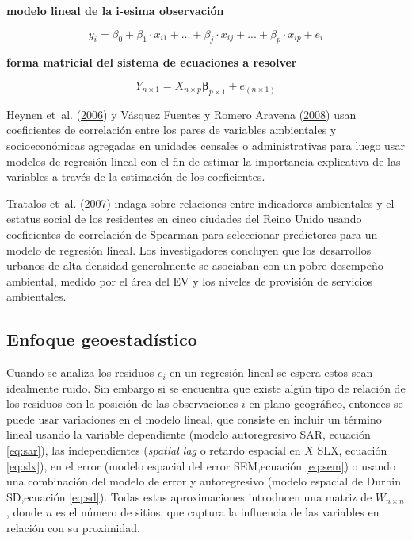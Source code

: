 \documentclass[12pt,a4paper,openany]{book}
\theoremstyle{definition}
\theoremstyle{definition}
\theoremstyle{definition}
\theoremstyle{remark}
\begin{document}
\textbf{modelo lineal de la i-esima observación}

\begin{equation}
y_i=\beta_0+ \beta_1\cdot  x_{i1}+...+\beta_j\cdot  x_{ij}+...+\beta_p\cdot  x_{ip}+e_i
\label{eq:lmodel}
\end{equation}

\textbf{forma matricial del sistema de ecuaciones a resolver}

\begin{equation}
Y_{n\times 1}=X_{n \times p }\mathbf{\beta}_{p\times 1}+e_{(n\times 1)}
\label{eq:lmodelM}
\end{equation}

Heynen et~al. (\protect\hyperlink{ref-heynen_political_2006}{2006}) y
Vásquez Fuentes y Romero Aravena
(\protect\hyperlink{ref-vasquez_fuentes_vegetacion_2008}{2008}) usan
coeficientes de correlación entre los pares de variables ambientales y
socioeconómicas agregadas en unidades censales o administrativas para
luego usar modelos de regresión lineal con el fin de estimar la
importancia explicativa de las variables a través de la estimación de
los coeficientes.

Tratalos et~al. (\protect\hyperlink{ref-tratalos_urban_2007}{2007})
indaga sobre relaciones entre indicadores ambientales y el estatus
social de los residentes en cinco ciudades del Reino Unido usando
coeficientes de correlación de Spearman para seleccionar predictores
para un modelo de regresión lineal. Los investigadores concluyen que los
desarrollos urbanos de alta densidad generalmente se asociaban con un
pobre desempeño ambiental, medido por el área del EV y los niveles de
provisión de servicios ambientales.

\subsection{Enfoque geoestadístico}\label{enfoque-geoestadistico}

Cuando se analiza los residuos \(e_i\) en un regresión lineal se espera
estos sean idealmente ruido. Sin embargo si se encuentra que existe
algún tipo de relación de los residuos con la posición de las
observaciones \(i\) en plano geográfico, entonces se puede usar
variaciones en el modelo lineal, que consiste en incluir un término
lineal usando la variable dependiente (modelo autoregresivo SAR,
ecuación \eqref{eq:sar}), las independientes (\emph{spatial lag} o retardo
espacial en \(X\) SLX, ecuación \eqref{eq:slx}), en el error (modelo
espacial del error SEM,ecuación \eqref{eq:sem}) o usando una combinación
del modelo de error y autoregresivo (modelo espacial de Durbin
SD,ecuación \eqref{eq:sd}). Todas estas aproximaciones introducen una
matriz de \(W_{n\times n}\), donde \(n\) es el número de sitios, que
captura la influencia de las variables en relación con su proximidad.
\end{document}
